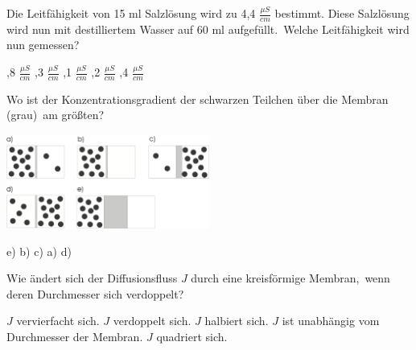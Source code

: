 \documentclass[11pt]{exam}
\begin{document}
\setlength{\voffset}{-0.5in}
\setlength{\headsep}{5pt}

\hspace{2mm}
 \hspace{5mm}
\vspace{4mm}

\begin{questions}

\question Die Leitfähigkeit von 15 ml Salzlösung wird zu 4,4 \( \frac{\mu S}{cm} \) bestimmt. Diese Salzlösung wird nun mit destilliertem Wasser auf 60 ml aufgefüllt. Welche Leitfähigkeit wird nun gemessen?

\begin{choices}
	,8 \(   \frac{\mu S}{cm}  \)
	,3 \(   \frac{\mu S}{cm}  \)
	,1 \(   \frac{\mu S}{cm}  \)
	,2 \(   \frac{\mu S}{cm}  \)
	,4 \(   \frac{\mu S}{cm}  \)
\end{choices}

\vspace{3mm}\question Wo ist der Konzentrationsgradient der schwarzen Teilchen über die Membran (grau) am größten? 

\includegraphics[width=0.5\textwidth]{../../../questions/E/images/Diffusion.png}

\begin{choices}
	\choice e)
	\choice b)
	\choice c)
	\choice a)
	\choice d)
\end{choices}

\vspace{3mm}\question Wie ändert sich der Diffusionsfluss \( J \) durch eine kreisförmige Membran, wenn deren Durchmesser sich verdoppelt?

\begin{choices}
	\choice \( J \) vervierfacht sich.
	\choice \( J \) verdoppelt sich.
	\choice \( J \) halbiert sich.
	\choice \( J \) ist unabhängig vom Durchmesser der Membran.
	\choice \( J \) quadriert sich.
\end{choices}


\end{questions}
\end{document}
